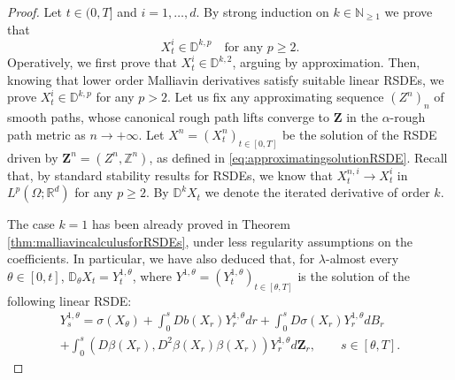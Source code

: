 \documentclass[11pt,a4paper]{article}
\theoremstyle{plain}
\begin{document}
\begin{proof}
  Let $t \in (0,T]$ and $i=1,\dots,d$. By strong induction on $k \in \mathbb{N}_{\ge 1}$
  we prove that \begin{equation*}
      X_t^i \in \mathbb{D}^{k, p} \quad \text{for any $p\ge 2$}.
  \end{equation*}
  Operatively, we first prove that $X_t^i \in \mathbb{D}^{k, 2}$, arguing by approximation. Then, knowing that lower order Malliavin derivatives satisfy suitable linear RSDEs, we prove $X_t^i \in
  \mathbb{D}^{k,p}$ for any $p > 2$.
  Let us fix any approximating sequence $(Z^n)_n$ of smooth paths, whose
  canonical rough path lifts converge to $\mathbf{Z}$ in the $\alpha$-rough path metric as $n\to +\infty$. Let $X^n = (X^n_t)_{t \in [0,T]}$ be the solution of the RSDE driven by $\mathbf{Z}^n = (Z^n, \mathbb{Z}^n)$, as defined in \eqref{eq:approximatingsolutionRSDE}. Recall that, by standard stability results for RSDEs, we know that $X_t^{n,i} \rightarrow X_t^i$ in $L^p
  (\Omega ; \mathbb{R}^d)$ for any $p \geqslant 2$. 
  By $\mathbb{D}^k X_t$ we denote the iterated derivative of order $k$. 
  

  
  The case $k = 1$ has been already proved in Theorem \ref{thm:malliavincalculusforRSDEs}, under less regularity assumptions on the coefficients. In particular, we have also deduced that, for $\lambda$-almost every $\theta \in [0,t]$, $\mathbb{D}_\theta X_t = Y^{1,\theta}_t$, where $Y^{1,\theta}=(Y^{1,\theta}_t)_{t \in [\theta,T]}$ is the solution of the following linear RSDE: \begin{multline*}  Y^{1,\theta}_s =\sigma(X_\theta) + \int_0^s Db(X_r)Y^{1,\theta}_r dr+ \int_0^s D\sigma(X_r)Y^{1,\theta}_r dB_r \\ + \int_0^s(D\beta(X_r),D^2\beta(X_r)\beta(X_r))Y^{1,\theta}_r d\mathbf{Z}_r, \qquad s \in [\theta,T] .
\end{multline*}



\end{proof}
\end{document}
